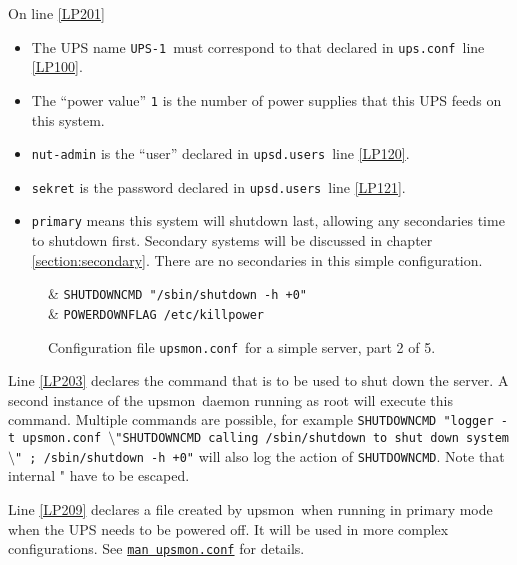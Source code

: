 \documentclass[12pt]{article}
\newcommand{\bsl}{$\setminus$}       %
\newcommand{\upsmon}{\mbox{\textcolor{MONCOLOUR}{upsmon}}}
\newcommand{\UPSi}{\texttt{UPS-1}}
\newcommand{\upsconf}{\textcolor{UPSDCOLOUR}{\texttt{ups.conf}}}
\newcommand{\upsdusers}{\textcolor{UPSDCOLOUR}{\texttt{upsd.users}}}
\newcommand{\upsmonconf}{\textcolor{MONCOLOUR}{\texttt{upsmon.conf}}}
\newcommand{\NUTman}[1]{\href{https://networkupstools.org/docs/man/#1.html}{\texttt{man #1}}}
\newcommand{\ul}{\begin{itemize}%
   \setlength{\itemsep}{0em}}
\newcommand{\eul}{\end{itemize}}
\newcommand{\li}{\item}                 %
\begin{document}
On line \ref{LP201}

\ul

\li The UPS name \UPSi\ must correspond to that declared in \upsconf\ line
\ref{LP100}.

\li The ``power value'' \texttt{1} is the number of power supplies that this
UPS feeds on this system.

\li \texttt{nut-admin} is the ``user'' declared in \upsdusers\ line \ref{LP120}.

\li \texttt{sekret} is the password declared in \upsdusers\ line \ref{LP121}.

\li \texttt{primary} means this system will shutdown last, allowing any secondaries
time to shutdown first.  Secondary systems will be discussed in chapter
\ref{section:secondary}. There are no secondaries in this simple configuration.

\eul

\begin{figure}[ht]
\vspace{-6mm}
\begin{LinePrinter}[0.85\LinePrinterwidth]
\Clunk[LP203]  & \verb`SHUTDOWNCMD "/sbin/shutdown -h +0"` \\
\Clunk[LP209]  & \verb`POWERDOWNFLAG /etc/killpower` \\
\end{LinePrinter}
\vspace{-6mm}
\caption{Configuration file \upsmonconf\ for a simple server, part 2 of 5.\label{fig:upsmonconf2}}
\end{figure}

Line \ref{LP203} declares the command that is to be used to shut down the
server.  A second instance of the \upsmon\ daemon running as root will execute
this command.  Multiple commands are possible, for example \texttt{SHUTDOWNCMD
  "logger -t upsmon.conf \bsl"SHUTDOWNCMD calling /sbin/shutdown to shut down
  system\bsl" ; /sbin/shutdown -h +0"} will also log the action of
\texttt{SHUTDOWNCMD}.  Note that internal " have to be escaped.

Line \ref{LP209} declares a file created by \upsmon\ when running in primary
mode when the UPS needs to be powered off.  It will be used in more complex
configurations.  See \NUTman{upsmon.conf} for details.
\end{document}

